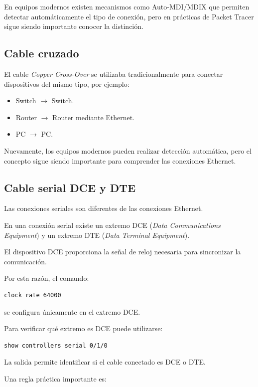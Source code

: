 \documentclass[12pt]{article}
\begin{document}
En equipos modernos existen mecanismos como Auto-MDI/MDIX que permiten
detectar automáticamente el tipo de conexión, pero en prácticas de
Packet Tracer sigue siendo importante conocer la distinción.


\subsection{Cable cruzado}

El cable \textit{Copper Cross-Over} se utilizaba tradicionalmente para
conectar dispositivos del mismo tipo, por ejemplo:

\begin{itemize}
    \item Switch $\rightarrow$ Switch.
    \item Router $\rightarrow$ Router mediante Ethernet.
    \item PC $\rightarrow$ PC.
\end{itemize}

Nuevamente, los equipos modernos pueden realizar detección automática, pero
el concepto sigue siendo importante para comprender las conexiones Ethernet.


\subsection{Cable serial DCE y DTE}

Las conexiones seriales son diferentes de las conexiones Ethernet.

En una conexión serial existe un extremo DCE (\textit{Data Communications
Equipment}) y un extremo DTE (\textit{Data Terminal Equipment}).

El dispositivo DCE proporciona la señal de reloj necesaria para sincronizar
la comunicación.

Por esta razón, el comando:

\begin{lstlisting}
clock rate 64000
\end{lstlisting}

se configura únicamente en el extremo DCE.

Para verificar qué extremo es DCE puede utilizarse:

\begin{lstlisting}
show controllers serial 0/1/0
\end{lstlisting}

La salida permite identificar si el cable conectado es DCE o DTE.

Una regla práctica importante es:
\end{document}
